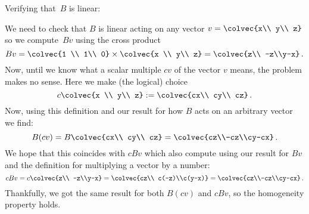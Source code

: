 \begin{example} Verifying that~$B$ is linear:

We need to check that $B$ is linear acting on any vector $v=\colvec{x\\ y\\ z}$ so we compute~$Bv$
using the cross product
$$
Bv=\colvec{1 \\ 1\\ 0} \times \colvec{x \\ y\\ z}=\colvec{z\\ -z\\y-x}\, .
$$
Now, until we know what a scalar multiple $cv$ of the vector $v$ means, the problem makes no sense. 
Here we make (the logical) choice
$$
c\colvec{x \\ y\\ z} := \colvec{cx\\ cy\\ cz}\, .
$$
Now, using this definition and our result for how $B$ acts on an arbitrary vector we find:
$$
B(cv)=B\colvec{cx\\ cy\\ cz}=\colvec{cz\\-cz\\cy-cx}\, .
$$
We hope that this coincides with $cBv$ which also compute using our result for $Bv$ and the definition
for multiplying a vector by a number:
$$
cBv=c\colvec{z\\ -z\\y-x}=\colvec{cz\\ c(-z)\\c(y-x)}=\colvec{cz\\-cz\\cy-cx}\, .
$$
Thankfully, we got the same result for both $B(cv)$ and $cBv$, so the homogeneity property holds.


\end{example}
